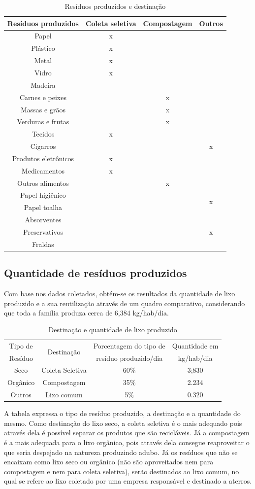 \begin{table}[H]
\centering
\begin{tabular}{|c|c|c|c|}
\hline 
Resíduos produzidos & Coleta seletiva & Compostagem & Outros\tabularnewline
\hline 
\hline 
Papel & x &  & \tabularnewline
\hline 
Plástico & x &  & \tabularnewline
\hline 
Metal & x &  & \tabularnewline
\hline 
Vidro & x &  & \tabularnewline
\hline 
Madeira &  &  & \tabularnewline
\hline 
Carnes e peixes &  & x & \tabularnewline
\hline 
Massas e grãos &  & x & \tabularnewline
\hline 
Verduras e frutas &  & x & \tabularnewline
\hline 
Tecidos & x &  & \tabularnewline
\hline 
Cigarros &  &  & x\tabularnewline
\hline 
Produtos eletrônicos & x &  & \tabularnewline
\hline 
Medicamentos & x &  & \tabularnewline
\hline 
Outros alimentos &  & x & \tabularnewline
\hline 
Papel higiênico & \multirow{2}{*}{} & \multirow{2}{*}{} & \multirow{2}{*}{x}\tabularnewline
Papel toalha &  &  & \tabularnewline
\hline 
Absorventes & \multirow{3}{*}{} & \multirow{3}{*}{} & \multirow{3}{*}{x}\tabularnewline
Preservativos &  &  & \tabularnewline
Fraldas &  &  & \tabularnewline
\hline 
\end{tabular}
\caption{Resíduos produzidos e destinação}
\end{table}

\subsection{Quantidade de resíduos produzidos}

Com base nos dados coletados, obtém-se os resultados da quantidade de lixo produzido e a sua reutilização através de um quadro comparativo, considerando que toda a família produza cerca de 6,384 kg/hab/dia.

\begin{table}[H]
\centering
\begin{tabular}{|c|c|c|c|}
\hline 
Tipo de & \multirow{2}{*}{Destinação} & Porcentagem do tipo de & Quantidade em\tabularnewline
Resíduo &  & resíduo produzido/dia & kg/hab/dia\tabularnewline
\hline 
\hline 
Seco & Coleta Seletiva & 60\% & 3;830\tabularnewline
\hline 
Orgânico & Compostagem & 35\% & 2.234\tabularnewline
\hline 
Outros & Lixo comum & 5\% & 0.320\tabularnewline
\hline 
\end{tabular}
\caption{Destinação e quantidade de lixo produzido}
\end{table}

	A tabela expressa o tipo de resíduo produzido, a destinação e a quantidade do mesmo. Como destinação do lixo seco, a coleta seletiva é o mais adequado pois através dela é possível separar os produtos que são recicláveis. Já a compostagem é a mais adequada para o lixo orgânico, pois através dela consegue reaproveitar o que seria despejado na natureza produzindo adubo. Já os resíduos que não se encaixam como lixo seco ou orgânico (não são aproveitados nem para compostagem e nem para coleta seletiva), serão destinados ao lixo comum, no qual se refere ao lixo coletado por uma empresa responsável e destinado a aterros.

